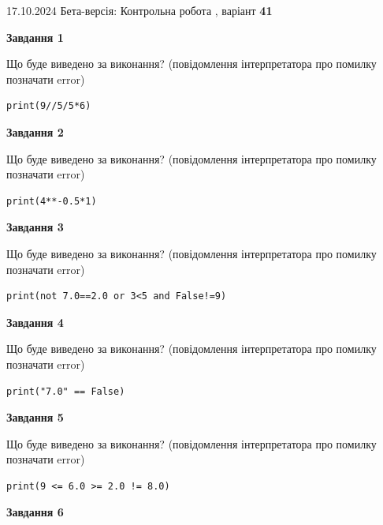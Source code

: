 \documentclass[12pt, ukrainian]{article}
\begin{document}
{\Large{17.10.2024 Бета-версія: Контрольна робота , варіант  \No \textbf { 41 }\par}}
{
\begin {large}
{\begin {center}\textbf{Завдання 1}\end {center}}

Що буде виведено за виконання? (повідомлення інтерпретатора про помилку позначати error)\par
\begin{verbatim}
print(9//5/5*6)
\end{verbatim}

{\begin {center}\textbf{Завдання 2}\end {center}}

Що буде виведено за виконання? (повідомлення інтерпретатора про помилку позначати error)\par
\begin{verbatim}
print(4**-0.5*1)
\end{verbatim}

{\begin {center}\textbf{Завдання 3}\end {center}}

Що буде виведено за виконання? (повідомлення інтерпретатора про помилку позначати error)\par
\begin{verbatim}
print(not 7.0==2.0 or 3<5 and False!=9)
\end{verbatim}

{\begin {center}\textbf{Завдання 4}\end {center}}

Що буде виведено за виконання? (повідомлення інтерпретатора про помилку позначати error)\par
\begin{verbatim}
print("7.0" == False)
\end{verbatim}

{\begin {center}\textbf{Завдання 5}\end {center}}

Що буде виведено за виконання? (повідомлення інтерпретатора про помилку позначати error)\par
\begin{verbatim}
print(9 <= 6.0 >= 2.0 != 8.0)
\end{verbatim}

{\begin {center}\textbf{Завдання 6}\end {center}}


\end{large}}
\end{document}
